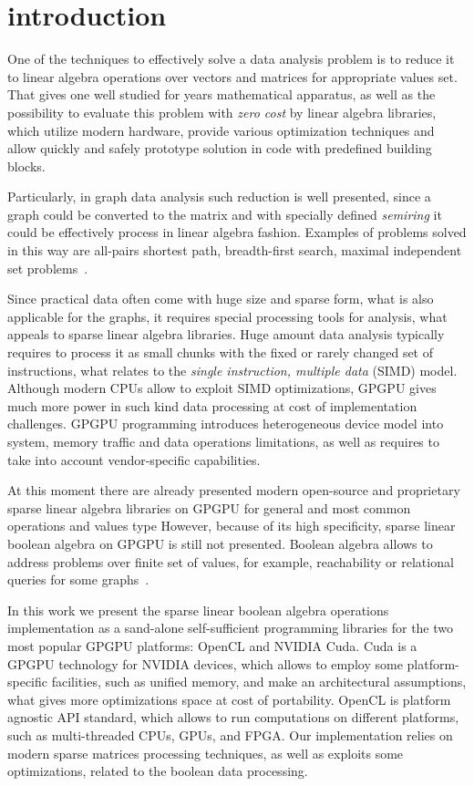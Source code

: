 \section{introduction}

One of the techniques to effectively solve a data analysis problem is to reduce it to linear algebra operations over vectors and matrices for appropriate values set. That gives one well studied for years mathematical apparatus, as well as the possibility to evaluate this problem with \textit{zero cost} by linear algebra libraries, which utilize modern hardware, provide various optimization techniques and allow quickly and safely prototype solution in code with predefined building blocks.

Particularly, in graph data analysis such reduction is well presented, since a graph could be converted to the matrix and with specially defined \textit{semiring} it could be effectively process in linear algebra fashion. Examples of problems solved in this way are all-pairs shortest path, breadth-first search, maximal independent set problems~\cite{todo}. 

Since practical data often come with huge size and sparse form, what is also applicable for the graphs, it requires special processing tools for analysis, what appeals to sparse linear algebra libraries. Huge amount data analysis typically requires to process it as small chunks with the fixed or rarely changed set of instructions, what relates to the \textit{single instruction, multiple data} (SIMD) model. Although modern CPUs allow to exploit SIMD optimizations, GPGPU gives much more power in such kind data processing at cost of implementation challenges. GPGPU programming introduces heterogeneous device model into system, memory traffic and data operations limitations, as well as requires to take into account vendor-specific capabilities. 

At this moment there are already presented modern open-source and proprietary sparse linear algebra libraries on GPGPU for general and most common operations and values type However, because of its high specificity, sparse linear boolean algebra on GPGPU is still not presented. Boolean algebra allows to address problems over finite set of values, for example, reachability or relational queries for some graphs~\cite{todo}. 

In this work we present the sparse linear boolean algebra operations implementation as a sand-alone self-sufficient programming libraries for the two most popular GPGPU platforms: OpenCL and NVIDIA Cuda. Cuda is a GPGPU technology for NVIDIA devices, which allows to employ some platform-specific facilities, such as unified memory, and make an architectural assumptions, what gives more optimizations space at cost of portability. OpenCL is platform agnostic API standard, which allows to run computations on different platforms, such as multi-threaded CPUs, GPUs, and FPGA. Our implementation relies on modern sparse matrices processing techniques, as well as exploits some optimizations, related to the boolean data processing.